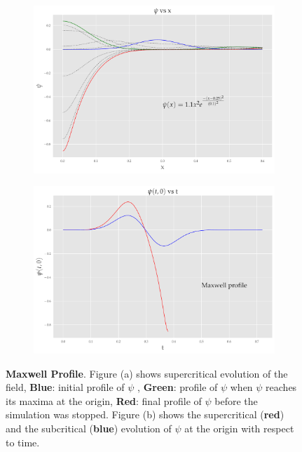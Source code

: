 \begin{figure}
    \centering
    \begin{subfigure}[b]{0.85\textwidth}
        \includegraphics[width=1\linewidth]{images/super_mod.pdf}
        \caption{}
        \label{fig:modified_gaussian}
    \end{subfigure}

    \begin{subfigure}[b]{0.85\textwidth}
        \includegraphics[width=1\linewidth]{images/at0_mod.pdf}
        \caption{}
        \label{fig:at0_modified_gaussian}
    \end{subfigure}
    \caption[Evolution of $\psi$ from an initial Maxwell profile(Modified Gaussian) profile]{\textbf{Maxwell Profile}. Figure (a) shows supercritical evolution of the field, \textbf{Blue}: initial profile of $\psi$ , \textbf{Green}: profile of $\psi$ when $\psi$ reaches its maxima at the origin, \textbf{Red}: final profile of $\psi$ before the simulation was stopped. Figure (b) shows the supercritical (\textbf{red}) and the subcritical (\textbf{blue}) evolution of $\psi$ at the origin with respect to time.}
\end{figure}

